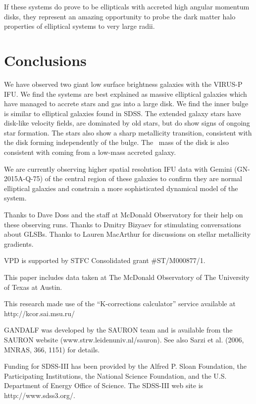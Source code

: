 \documentclass{emulateapj}
\newcommand\HI{\ion{H}{1}}
\begin{document}
If these systems do prove to be ellipticals with accreted high angular momentum disks, they represent an amazing opportunity to probe the dark matter halo properties of elliptical systems to very large radii. 


\section{Conclusions}\label{sec:conclusions}

We have observed two giant low surface brightness galaxies with the VIRUS-P IFU.  We find the systems are best explained as massive elliptical galaxies which have managed to accrete stars and gas into a large disk.  We find the inner bulge is similar to elliptical galaxies found in SDSS.  The extended galaxy stars have disk-like velocity fields, are dominated by old stars, but do show signs of ongoing star formation. The stars also show a sharp metallicity transition, consistent with the disk forming independently of the bulge. The \HI\ mass of the disk is also consistent with coming from a low-mass accreted galaxy.

We are currently observing higher spatial resolution IFU data with Gemini (GN-2015A-Q-75) of the central region of these galaxies to confirm they are normal elliptical galaxies and constrain a more sophisticated dynamical model of the system.

\acknowledgments
Thanks to Dave Doss and the staff at McDonald Observatory for their help on these observing runs. Thanks to Dmitry Bizyaev for stimulating conversations about GLSBs. Thanks to Lauren MacArthur for discussions on stellar metallicity gradients.

VPD is supported by STFC Consolidated grant \#ST/M000877/1.

This paper includes data taken at The McDonald Observatory of The University of Texas at Austin.


This research made use of the ``K-corrections calculator'' service available at http://kcor.sai.msu.ru/

GANDALF was developed by the SAURON team and is available from the SAURON website (www.strw.leidenuniv.nl/sauron). See also Sarzi et al. (2006, MNRAS, 366, 1151) for details.

Funding for SDSS-III has been provided by the Alfred P. Sloan Foundation, the Participating Institutions, the National Science Foundation, and the U.S. Department of Energy Office of Science. The SDSS-III web site is http://www.sdss3.org/.
\end{document}
